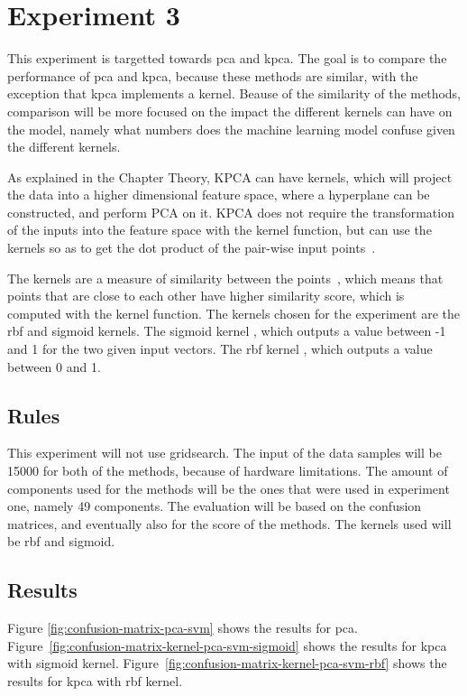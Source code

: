 \section{Experiment 3}
This experiment is targetted towards \gls{pca} and \gls{kpca}. The goal is to compare the performance of \gls{pca} and \gls{kpca}, because these methods are similar, with the exception that \gls{kpca} implements a kernel. Beause of the similarity of the methods, comparison will be more focused on the impact the different kernels can have on the model, namely what numbers does the machine learning model confuse given the different kernels.


As explained in the Chapter Theory, KPCA can have kernels, which will project the data into a higher dimensional feature space, where a hyperplane can be constructed, and perform PCA on it. KPCA does not require the transformation of the inputs into the feature space with the kernel function, but can use the kernels so as to get the dot product of the pair-wise input points~\cite{kpca-book}.


The kernels are a measure of similarity between the points~\cite{scikit-learn}, which means that points that are close to each other have higher similarity score, which is computed with the kernel function. The kernels chosen for the experiment are the \gls{rbf} and sigmoid kernels. The sigmoid kernel , which outputs a value between -1 and 1 for the two given input vectors. The \gls{rbf} kernel , which outputs a value between 0 and 1.


\subsection{Rules}
This experiment will not use gridsearch. The input of the data samples will be 15000 for both of the methods, because of hardware limitations. The amount of components used for the methods will be the ones that were used in experiment one, namely 49 components. The evaluation will be based on the confusion matrices, and eventually also for the score of the methods. The kernels used will be \gls{rbf} and sigmoid.


\subsection{Results}
Figure \ref{fig:confusion-matrix-pca-svm} shows the results for \gls{pca}.
Figure~\ref{fig:confusion-matrix-kernel-pca-svm-sigmoid} shows the results for \gls{kpca} with sigmoid kernel.
Figure~\ref{fig:confusion-matrix-kernel-pca-svm-rbf} shows the results for \gls{kpca} with rbf kernel.


